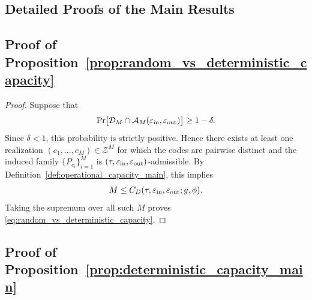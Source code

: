 \documentclass[journal]{IEEEtran}
\renewcommand\thesection{\arabic{section}}
\renewcommand\thesubsection{\arabic{section}.\arabic{subsection}}
\def\thesectiondis{\thesection.}
\def\thesubsectiondis{\thesectiondis\arabic{subsection}.}
\begin{document}
\begin{bibunit}

\renewcommand{\thesubsection}{\thesection.\arabic{subsection}}
\renewcommand{\thesubsectiondis}{\thesection.\arabic{subsection}.}
  

\section{Detailed Proofs of the Main Results}
\label{sec:omitted-proofs}


\subsection{Proof of Proposition~\ref{prop:random_vs_deterministic_capacity}}
\label{app:proof_prop_random_vs_deterministic_capacity}


\begin{proof}
%
Suppose that
%
\begin{equation}
\Pr\bigl[\mathcal D_M\cap\mathcal A_M(\varepsilon_{\rm in},\varepsilon_{\rm out})\bigr] \ge 1-\delta.
\end{equation}
%
Since $\delta<1$, this probability is strictly positive. Hence there exists at least one realization $(c_1,\ldots,c_M)\in\mathcal Z^M$ for which the codes are pairwise distinct and the induced family $\{P_{c_i}\}_{i=1}^M$ is $(\tau,\varepsilon_{\rm in},\varepsilon_{\rm out})$-admissible. By Definition~\ref{def:operational_capacity_main}, this implies
%
\begin{equation}
M\le C_D(\tau,\varepsilon_{\rm in},\varepsilon_{\rm out};g,\phi).
\end{equation}
%
Taking the supremum over all such $M$ proves \eqref{eq:random_vs_deterministic_capacity}.
%
\end{proof}




\subsection{Proof of Proposition~\ref{prop:deterministic_capacity_main}}
\label{app:proof_prop_deterministic_capacity}


\end{bibunit}
\end{document}
